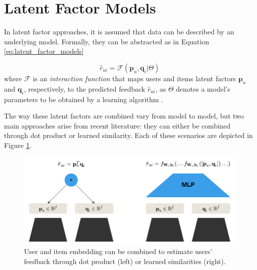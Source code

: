 


\section{Latent Factor Models}

In latent factor approaches, it is assumed that data can be described by an underlying model. Formally, they can be abstracted as in Equation \ref{eq:latent_factor_models}

\begin{equation}
    \label{eq:latent_factor_models}
    \hat{r}_{ui} = \mathcal{F}(\mathbf{p}_u, \mathbf{q}_i|\Theta)
\end{equation} where $\mathcal{F}$ is an \textit{interaction function} that maps users and items latent factors $\mathbf{p}_u$ and $\mathbf{q}_i$, respectively, to the predicted feedback $\hat{r}_{ui}$, as $\Theta$ denotes a model's parameters to be obtained by a learning algorithm \cite{10.1145/3038912.3052569}.

The way these latent factors are combined vary from model to model, but two main approaches arise from recent literature: they can either be combined through dot product or learned similarity. Each of these scenarios are depicted in Figure \ref{fig:latent_factors}.

\begin{figure}[ht]
    \centering
    \includegraphics[width=\textwidth]{figs/latent_factors.png}
    \caption{User and item embedding can be combined to estimate users' feedback through dot product (left) or learned similarities (right).}
    \label{fig:latent_factors}
\end{figure}


